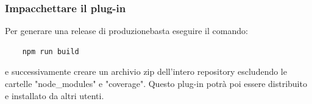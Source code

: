 \subsubsection{Impacchettare il plug-in}%
Per generare una release di produzione\glosp basta eseguire il comando:
\begin{verbatim}
	npm run build	
\end{verbatim}
e successivamente creare un archivio zip dell'intero repository escludendo le cartelle "node\_modules" e "coverage". Questo plug-in potrà poi essere distribuito e installato da altri utenti. 
